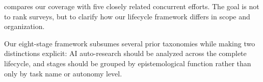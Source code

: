  compares our coverage with five closely related concurrent efforts. The goal is not to rank surveys, but to clarify how our lifecycle framework differs in scope and organization.

Our eight-stage framework subsumes several prior taxonomies while making two distinctions explicit: AI auto-research should be analyzed across the complete lifecycle, and stages should be grouped by epistemological function rather than only by task name or autonomy level.


\begin{table}
\vspace{-12pt}
\centering
\caption{%
  Comparison of survey coverage across our four-phase research lifecycle framework.
  \cmarkc~= in-depth coverage, \pmarkc~= partial coverage, \xmarkc~= not covered,
  {\textcolor{violet}{\scriptsize$\bigstar$\,new}}~= newly introduced stage.
}
\vspace{-6pt}
\label{tab:survey_comparison}
\renewcommand{\arraystretch}{1.15}
\setlength{\tabcolsep}{3pt}
\end{table}
